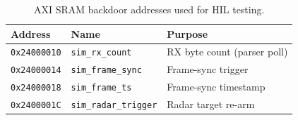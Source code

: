 \begin{table}[htbp]
\centering
\caption{AXI SRAM backdoor addresses used for HIL testing.}
\label{tab:D:backdoors}
\begin{tabular}{@{}lll@{}}
\toprule
\textbf{Address} & \textbf{Name} & \textbf{Purpose} \\
\midrule
\texttt{0x24000010} & \texttt{sim\_rx\_count} & RX byte count (parser poll) \\
\texttt{0x24000014} & \texttt{sim\_frame\_sync} & Frame-sync trigger \\
\texttt{0x24000018} & \texttt{sim\_frame\_ts} & Frame-sync timestamp \\
\texttt{0x2400001C} & \texttt{sim\_radar\_trigger} & Radar target re-arm \\
\bottomrule
\end{tabular}
\end{table}